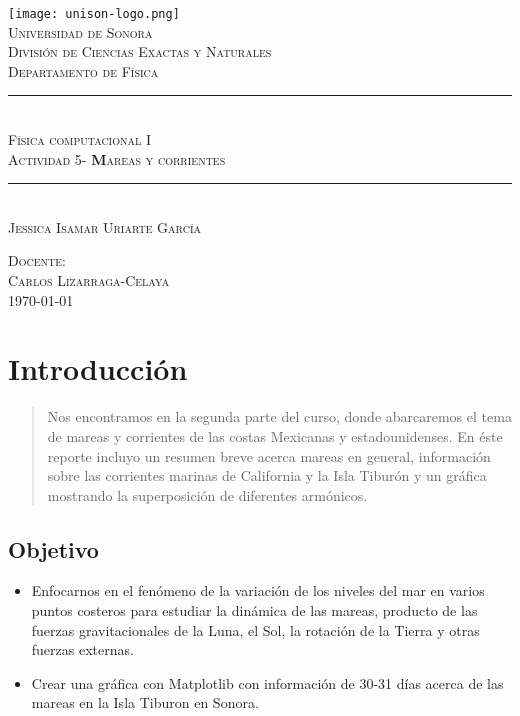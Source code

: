 \documentclass[12pt]{article}
\newcommand{\HRule}{\rule{\linewidth}{0.5mm}}
\begin{document}
    \begin{center}


\texttt{[image: unison-logo.png]}~\\[1cm]

\textsc{\LARGE Universidad de Sonora}\\[0.1cm]
\textsc{Divisi\'on de Ciencias Exactas y Naturales}\\[0.1cm]
\textsc{Departamento de F\'isica}\\[1.5cm]

\HRule \\[0.4cm]
\textsc{Física computacional I}\\[0.1cm]
\textsc{Actividad 5- {\color{teal}\textbf Mareas y corrientes}}
\HRule \\[1.5cm]


\textsc{Jessica Isamar Uriarte García\\[1.0cm]}

\textsc{Docente:\\Carlos Lizarraga-Celaya\\[0.1cm]}
\vfill
\textsc{\today \\[0.1cm]}
    \end{center}
\newpage

        \section{Introducción}

    \begin{abstract}
\noindent Nos encontramos en la segunda parte del curso, donde abarcaremos el tema de mareas y corrientes de las costas Mexicanas y estadounidenses. En \'este reporte incluyo un resumen breve acerca mareas\cite{a} en general, informaci\'on sobre las corrientes marinas de California y la Isla Tibur\'on y un gr\'afica mostrando la superposici\'on de diferentes arm\'onicos. 
    \end{abstract}
            \subsection{Objetivo}
    \begin{itemize}
        \item Enfocarnos en el fenómeno de la variación de los niveles del mar en varios puntos costeros para estudiar la dinámica de las mareas, producto de las fuerzas gravitacionales de la Luna, el Sol, la rotación de la Tierra y otras fuerzas externas.
        \item Crear una gr\'afica con Matplotlib con informaci\'on de 30-31 d\'ias acerca de las mareas en la Isla Tiburon en Sonora. 
    \end{itemize}
\end{document}
